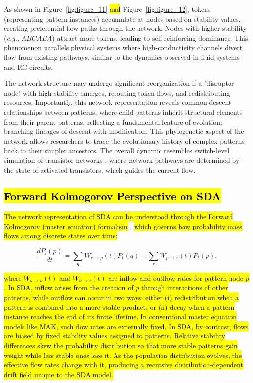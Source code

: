 \documentclass[preprint,12pt]{elsarticle}
\newcommand{\added}[1]{\hl{#1}}
\begin{document}
As shown in Figure~\ref{fig:figure_11} \added{and} Figure~\ref{fig:figure_12}, tokens (representing pattern instances) accumulate at nodes based on stability values, creating preferential flow paths through the network. Nodes with higher stability (\textit{e.g.}, $ABCABA$) attract more tokens, leading to self-reinforcing dominance. This phenomenon parallels physical systems where high-conductivity channels divert flow from existing pathways, similar to the dynamics observed in fluid systems and RC circuits.

The network structure may undergo significant reorganization if a "disruptor node" with high stability emerges, rerouting token flows, and redistributing resources. Importantly, this network representation reveals common descent relationships between patterns, where child patterns inherit structural elements from their parent patterns, reflecting a fundamental feature of evolution: branching lineages of descent with modification. This phylogenetic aspect of the network allows researchers to trace the evolutionary history of complex patterns back to their simpler ancestors. The overall dynamic resembles switch-level simulation of transistor networks \cite{AdlerCAD}, where network pathways are determined by the state of activated transistors, which guides the current flow.

\subsection{\added{Forward Kolmogorov Perspective on SDA}}

\added{The network representation of SDA can be understood through the Forward Kolmogorov (master equation) formalism} \cite{gardiner}, \added{which governs how probability mass flows among discrete states over time:}

\begin{equation}
\label{eq:kolmogorov-general}
\frac{dP_t(p)}{dt}
= \sum_{q} W_{q \to p}(t) P_t(q)
- \sum_{r} W_{p \to r}(t) P_t(p),
\end{equation}

\added{where $W_{q \to p}(t)$ and $W_{p \to r}(t)$ are inflow and outflow rates for pattern node $p$. In SDA, inflow arises from the creation of $p$ through interactions of other patterns, while outflow can occur in two ways: either (i) redistribution when a pattern is combined into a more stable product, or (ii) decay when a pattern instance reaches the end of its finite lifetime. In conventional master equation models like MAK, such flow rates are externally fixed. In SDA, by contrast, flows are biased by fixed stability values assigned to patterns. Relative stability differences skew the probability distribution so that more stable patterns gain weight while less stable ones lose it. As the population distribution evolves, the effective flow rates change with it, producing a recursive distribution-dependent drift field unique to the SDA model.}
\end{document}
